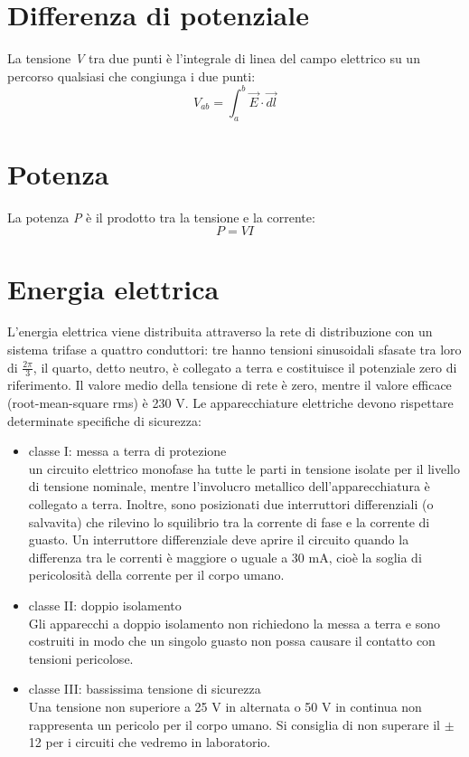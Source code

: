 \documentclass{article}
\begin{document}
  	\section{Differenza di potenziale}
  		La tensione \emph{V} tra due punti è l'integrale di linea del campo elettrico su un percorso qualsiasi che congiunga i due punti: \[ V_{ab} = \int_a^b \vec{E} \cdot \vec{dl} \]
  		
  	\section{Potenza}
  		La potenza \emph{P} è il prodotto tra la tensione e la corrente: \[ P = V I \]
	
	\section{Energia elettrica}
		L'energia elettrica viene distribuita attraverso la rete di distribuzione con un sistema trifase a quattro conduttori: tre hanno tensioni sinusoidali sfasate tra loro di $\frac{2\pi}{3}$, il quarto, detto neutro, è collegato a terra e costituisce il potenziale zero di riferimento. Il valore medio della tensione di rete è zero, mentre il valore efficace (root-mean-square rms) è 230 V. 
		Le apparecchiature elettriche devono rispettare determinate specifiche di sicurezza: 
		\begin{itemize}
			\item classe I: messa a terra di protezione \\
				un circuito elettrico monofase ha tutte le parti in tensione isolate per il livello di tensione nominale, mentre l'involucro metallico dell'apparecchiatura è collegato a terra. Inoltre, sono posizionati due interruttori differenziali (o salvavita) che rilevino lo squilibrio tra la corrente di fase e la corrente di guasto. Un interruttore differenziale deve aprire il circuito quando la differenza tra le correnti è maggiore o uguale a 30 mA, cioè la soglia di pericolosità della corrente per il corpo umano. 
				 
			\item classe II: doppio isolamento \\
				Gli apparecchi a doppio isolamento non richiedono la messa a terra e sono costruiti in modo che un singolo guasto non possa causare il contatto con tensioni pericolose.
				
			\item classe III: bassissima tensione di sicurezza \\
				Una tensione non superiore a 25 V in alternata o 50 V in continua non rappresenta un pericolo per il corpo umano. Si consiglia di non superare il $\pm$ 12 per i circuiti che vedremo in laboratorio. 
				
    	\end{itemize}
\end{document}
